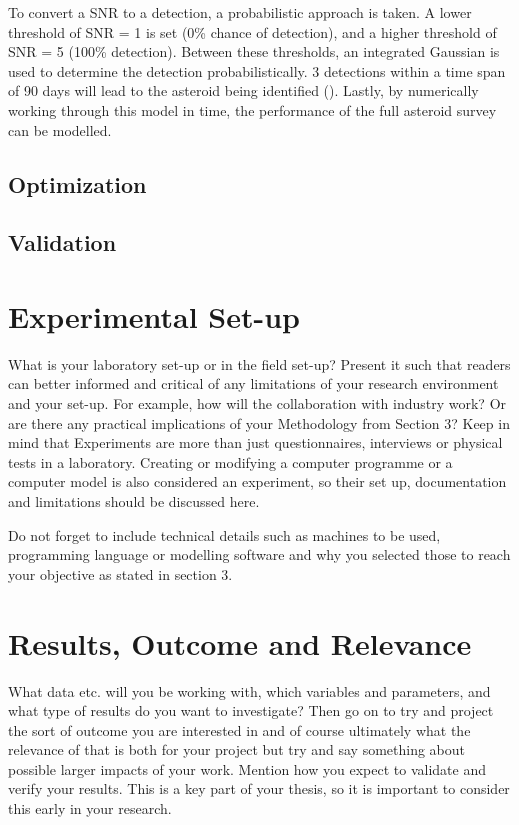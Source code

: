 \documentclass[12pt, english, NoHyper]{AE4010-template}
\begin{document}
To convert a SNR to a detection, a probabilistic approach is taken. A lower threshold of SNR = 1 is set (0\% chance of detection), and a higher threshold of SNR = 5 (100\% detection). Between these thresholds, an integrated Gaussian is used to determine the detection probabilistically. 3 detections within a time span of 90 days will lead to the asteroid being identified (\cite{NEOSDT1}). Lastly, by numerically working through this model in time, the performance of the full asteroid survey can be modelled.

\subsection{Optimization}


\subsection{Validation}


\section{Experimental Set-up}
What is your laboratory set-up or in the field set-up? Present it such that readers can better informed and critical of any limitations of your research environment and your set-up. For example, how will the collaboration with industry work? Or are there any practical implications of your Methodology from Section 3? Keep in mind that Experiments are more than just questionnaires, interviews or physical tests in a laboratory. Creating or modifying a computer programme or a computer model is also considered an experiment, so their set up, documentation and limitations should be discussed here. 

Do not forget to include technical details such as machines to be used, programming language or modelling software and why you selected those to reach your objective as stated in section 3.




\section{Results, Outcome and Relevance}
What data etc. will you be working with, which variables and parameters, and what type of results do you want to investigate? Then go on to try and project the sort of outcome you are interested in and of course ultimately what the relevance of that is both for your project but try and say something about possible larger impacts of your work. Mention how you expect to validate and verify your results. This is a key part of your thesis, so it is important to consider this early in your research.
\end{document}

